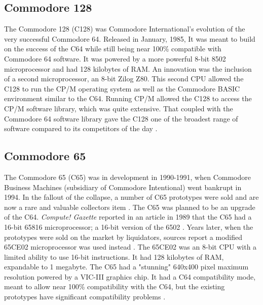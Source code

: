 \subsection{Commodore 128}
The Commodore 128 (C128) was Commodore International's evolution of the very successful Commodore 64. Released in January, 1985, It was meant to build on the success of the C64 while still being near 100\% compatible with Commodore 64 software. It was powered by a more powerful 8-bit 8502 microprocessor and had 128 kilobytes of RAM. An innovation was the inclusion of a second microprocessor, an 8-bit Zilog Z80. This second CPU allowed the C128 to run the CP/M operating system as well as the Commodore BASIC environment similar to the C64. Running CP/M allowed the C128 to access the CP/M software library, which was quite extensive. That coupled with the Commodore 64 software library gave the C128 one of the broadest range of software compared to its competitors of the day
\cite{RN32}.

\subsection{Commodore 65}
The Commodore 65 (C65) was in development in 1990-1991, when Commodore Business Machines (subsidiary of Commodore Intentional) went bankrupt in 1994. In the fallout of the collapse, a number of C65 prototypes were sold and are now a rare and valuable collectors item \cite{RN132}. The C65 was planned to be an upgrade of the C64. \textit{Compute! Gazette} reported in an article in 1989 that the C65 had a 16-bit 65816 microprocessor; a 16-bit version of the 6502 
\cite{RN31}. Years later, when the prototypes were sold on the market by liquidators, sources report a modified 65CE02 microprocessor was used instead
\cite{RN30}
\cite{RN78}. The 65CE02 was an 8-bit CPU with a limited ability to use 16-bit instructions. It had 128 kilobytes of RAM, expandable to 1 megabyte. The C65 had a "stunning" 640x400 pixel maximum resolution 
\cite{RN31} powered by a VIC-III graphics chip. It had a C64 compatibility mode, meant to allow near 100\% compatibility with the C64, but the existing prototypes have significant compatibility problems
\cite{RN30}. 

